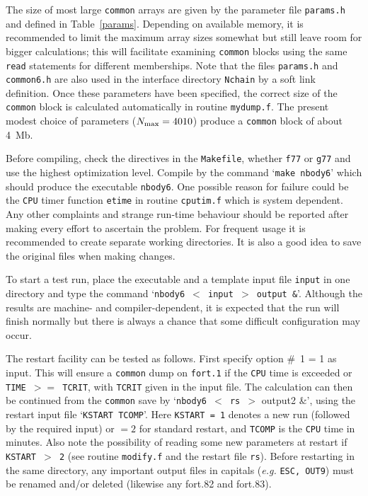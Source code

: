 \documentclass[12pt]{article}
\begin{document}
The size of most large {\tt common} arrays are given by the parameter file
{\tt params.h} and defined in Table~\ref{params}.
Depending on available memory, it is recommended to limit the maximum array
sizes somewhat but still leave room for bigger calculations; this will
facilitate examining {\tt common} blocks using the same {\tt read}
statements for different memberships.
Note that the files {\tt params.h} and {\tt common6.h} are also used in the
interface directory {\tt Nchain} by a soft link definition.
Once these parameters have been specified, the correct size of the
{\tt common} block is calculated automatically in routine {\tt mydump.f}.
The present modest choice of parameters ($N_{\rm max} = 4010$) produce a
{\tt common} block of about 4~Mb.

Before compiling, check the {} directives in the {\tt Makefile},
\ie whether {\tt f77} or {\tt g77} and use the highest optimization level.
Compile by the command `{\tt make nbody6}' which should produce the
executable {\tt nbody6}.
One possible reason for failure could be the {\tt CPU} timer function
{\tt etime} in routine {\tt cputim.f} which is system dependent.
Any other complaints and strange run-time behaviour should be reported after
making every effort to ascertain the problem.
For frequent usage it is recommended to create separate working directories.
It is also a good idea to save the original files when making changes.

To start a test run, place the executable and a template input file
{\tt input} in one directory and type the command
`{\tt nbody6 $<$ input $>$ output \&}'.
Although the results are machine- and compiler-dependent, it is expected that
the run will finish normally but there is always a chance that some difficult
configuration may occur.

The restart facility can be tested as follows.
First specify option \#~1 = 1 as input.
This will ensure a {\tt common} dump on {\tt fort.1} if the {\tt CPU} time is
exceeded or {\tt TIME $>=$ TCRIT}, with {\tt TCRIT} given in the input file.
The calculation can then be continued from the {\tt common} save by
`{\tt nbody6 $<$ rs $>$} output2 \&',
using the restart input file `{\tt KSTART TCOMP}'.
Here {\tt KSTART = 1} denotes a new run (followed by the required input)
or $= 2$ for standard restart, and {\tt TCOMP} is the {\tt CPU} time in
minutes.
Also note the possibility of reading some new parameters at restart if
{\tt KSTART $>$ 2} (see routine {\tt modify.f} and the restart
file {\tt rs}).
Before restarting in the same directory, any important output files in
capitals ({\it e.g.} {\tt ESC, OUT9}) must be renamed and/or deleted
(likewise any fort.82 and fort.83).
\end{document}
